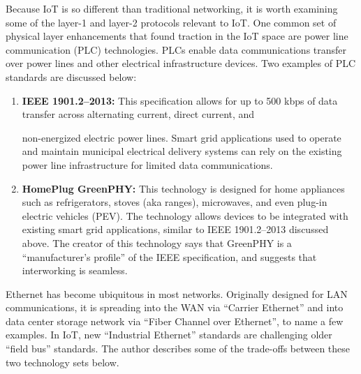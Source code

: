 Because IoT is so different than traditional networking, it is worth examining
some of the layer-1 and layer-2 protocols relevant to IoT. One common set of
physical layer enhancements that found traction in the IoT space are power
line communication (PLC) technologies. PLCs enable data communications
transfer over power lines and other electrical infrastructure devices. Two
examples of PLC standards are discussed below:

\begin{enumerate}
  \item \textbf{IEEE 1901.2--2013:} This specification allows for up to 500
  kbps of data transfer across alternating current, direct current, and

  non-energized electric power lines. Smart grid applications used to operate
  and maintain municipal electrical delivery systems can rely on the existing
  power line infrastructure for limited data communications.
  \item \textbf{HomePlug GreenPHY:} This technology is designed for home
  appliances such as refrigerators, stoves (aka ranges), microwaves, and even
  plug-in electric vehicles (PEV). The technology allows devices to be
  integrated with existing smart grid applications, similar to IEEE
  1901.2--2013 discussed above. The creator of this technology says that
  GreenPHY is a ``manufacturer's profile'' of the IEEE specification, and
  suggests that interworking is seamless.
\end{enumerate}

Ethernet has become ubiquitous in most networks. Originally designed for LAN
communications, it is spreading into the WAN via ``Carrier Ethernet'' and into
data center storage network via ``Fiber Channel over Ethernet'', to name a few
examples. In IoT, new ``Industrial Ethernet'' standards are challenging older
``field bus'' standards. The author describes some of the trade-offs between
these two technology sets below.


